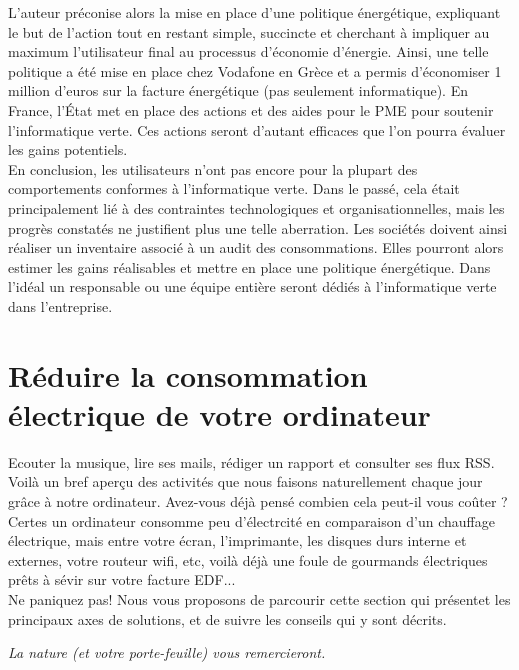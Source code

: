 \documentclass[a4paper,11pt,french]{article}
\begin{document}
L’auteur préconise alors la mise en place d’une politique énergétique, expliquant le but de l’action tout en restant simple, succincte et cherchant à impliquer au maximum l’utilisateur final au processus d’économie d’énergie. Ainsi, une telle politique a été mise en place chez Vodafone en Grèce et a permis d’économiser 1 million d’euros sur la facture énergétique (pas seulement informatique). En France, l’État met en place des actions et des aides pour le PME pour soutenir l’informatique verte. Ces actions seront d’autant efficaces que l’on pourra évaluer les gains potentiels.\\

En conclusion, les utilisateurs n’ont pas encore pour la plupart des comportements conformes à l’informatique verte. Dans le passé, cela était principalement lié à des contraintes technologiques et organisationnelles, mais les progrès constatés ne justifient plus une telle aberration. Les sociétés doivent ainsi réaliser un inventaire associé à un audit des consommations. Elles pourront alors estimer les gains réalisables et mettre en place une politique énergétique. Dans l’idéal un responsable ou une équipe entière seront dédiés à l’informatique verte dans l’entreprise.\\



\section[Réduire sa consommation]{Réduire la consommation électrique de votre ordinateur}

Ecouter la musique, lire ses mails, rédiger un rapport et consulter ses flux RSS. Voilà un bref aperçu des activités que nous faisons naturellement chaque jour grâce à notre ordinateur. Avez-vous déjà pensé combien cela peut-il vous coûter ?
Certes un ordinateur consomme peu d'électrcité en comparaison d'un chauffage électrique, mais entre votre écran, l'imprimante, les disques durs interne et externes, votre routeur wifi, etc, voilà déjà une foule de gourmands électriques prêts à sévir sur votre facture EDF...\\

Ne paniquez pas! Nous vous proposons de parcourir cette section qui présentet les principaux axes de solutions, et de suivre les conseils qui y sont décrits.\\
\begin{center}
\emph{La nature (et votre porte-feuille) vous remercieront.}
\end{center}
\end{document}
